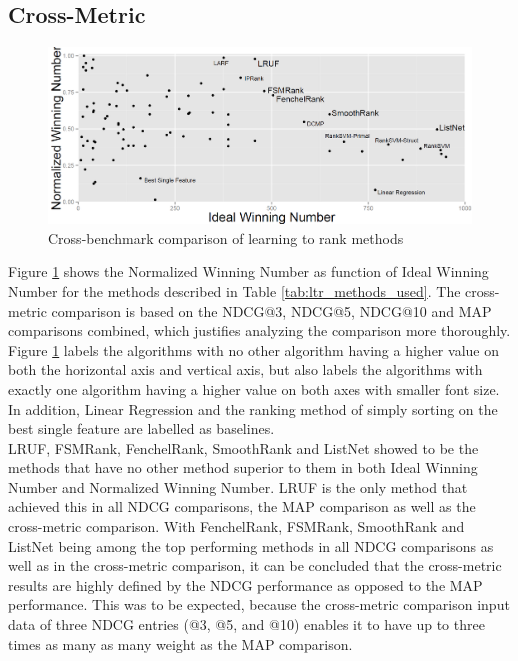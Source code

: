 \documentclass{sig-alternate-2013}
\begin{document}
\subsection{Cross-Metric}
\begin{figure}
\includegraphics[scale=0.4235]{gfx/combined_normalized_winnum}
\caption{Cross-benchmark comparison of learning to rank methods}
\label{fig:normalised_winning_number_all}
\end{figure}
Figure \ref{fig:normalised_winning_number_all} shows the Normalized Winning Number as function of Ideal Winning Number for the methods described in Table \ref{tab:ltr_methods_used}. The cross-metric comparison is based on the NDCG@3, NDCG@5, NDCG@10 and MAP comparisons combined, which justifies analyzing the comparison more thoroughly. Figure \ref{fig:normalised_winning_number_all} labels the algorithms with no other algorithm having a higher value on both the horizontal axis and vertical axis, but also labels the algorithms with exactly one algorithm having a higher value on both axes with smaller font size. In addition, Linear Regression and the ranking method of simply sorting on the best single feature are labelled as baselines.\\

LRUF, FSMRank, FenchelRank, SmoothRank and ListNet showed to be the methods that have no other method superior to them in both Ideal Winning Number and Normalized Winning Number. LRUF is the only method that achieved this in all NDCG comparisons, the MAP comparison as well as the cross-metric comparison. With FenchelRank, FSMRank, SmoothRank and ListNet being among the top performing methods in all NDCG comparisons as well as in the cross-metric comparison, it can be concluded that the cross-metric results are highly defined by the NDCG performance as opposed to the MAP performance. This was to be expected, because the cross-metric comparison input data of three NDCG entries (@3, @5, and @10) enables it to have up to three times as many as many weight as the MAP comparison.\\
\end{document}
